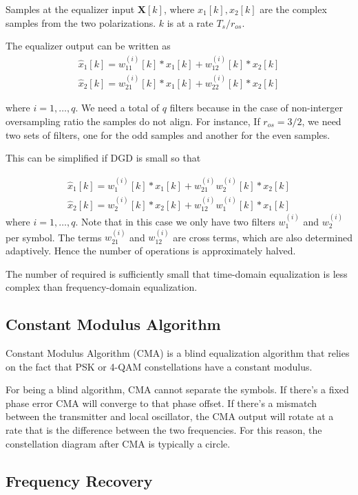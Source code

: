 \documentclass[a4paper]{article}
\begin{document}
Samples at the equalizer input $\bm{X}[k]$, where $x_1[k], x_2[k]$ are the complex samples from the two polarizations. $k$ is at a rate $T_s/r_{os}$.

The equalizer output can be written as
\begin{align}
\hat{x}_{1}[k] = w^{(i)}_{11}[k]\ast x_1[k] + w^{(i)}_{12}[k]\ast x_2[k] \\
\hat{x}_{2}[k] = w^{(i)}_{21}[k]\ast x_1[k] + w^{(i)}_{22}[k]\ast x_2[k]
\end{align}

where $i = 1, \ldots, q$. We need a total of $q$ filters because in the case of non-interger oversampling ratio the samples do not align. For instance, If $r_{os} = 3/2$, we need two sets of filters, one for the odd samples and another for the even samples.

This can be simplified if DGD is small so that 

\begin{align}
\hat{x}_{1}[k] = w^{(i)}_{1}[k]\ast x_1[k] + w_{21}^{(i)}w^{(i)}_{2}[k]\ast x_2[k] \\
\hat{x}_{2}[k] = w^{(i)}_{2}[k]\ast x_2[k] + w_{12}^{(i)}w^{(i)}_{1}[k]\ast x_1[k]
\end{align}
where $i = 1, \ldots, q$. Note that in this case we only have two filters $w^{(i)}_{1}$ and $w^{(i)}_{2}$ per symbol. The terms $w_{21}^{(i)}$ and $w_{12}^{(i)}$ are cross terms, which are also determined adaptively. Hence the number of operations is approximately halved.

The number of required is sufficiently small that time-domain equalization is less complex than frequency-domain equalization.

\subsection{Constant Modulus Algorithm}

Constant Modulus Algorithm (CMA) is a blind equalization algorithm that relies on the fact that PSK or 4-QAM constellations have a constant modulus. 

For being a blind algorithm, CMA cannot separate the symbols. If there's a fixed phase error CMA will converge to that phase offset. If there's a mismatch between the transmitter and local oscillator, the CMA output will rotate at a rate that is the difference between the two frequencies. For this reason, the constellation diagram after CMA is typically a circle. 


\subsection{Frequency Recovery}
\cite{Hoffmann2008} 
\end{document}

